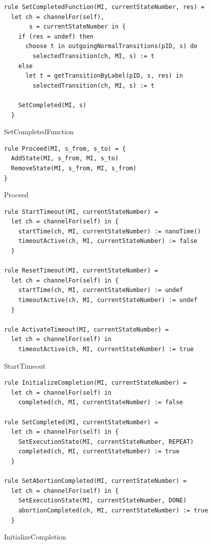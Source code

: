 \begin{listing}[H]
\begin{verbatim}
rule SetCompletedFunction(MI, currentStateNumber, res) =
  let ch = channelFor(self),
       s = currentStateNumber in {
    if (res = undef) then
      choose t in outgoingNormalTransitions(pID, s) do
        selectedTransition(ch, MI, s) := t
    else
      let t = getTransitionByLabel(pID, s, res) in
        selectedTransition(ch, MI, s) := t

    SetCompleted(MI, s)
  }
\end{verbatim}
\caption{SetCompletedFunction}
\label{lst:asm:SetCompletedFunction}
\end{listing}



\begin{listing}[H]
\begin{verbatim}
rule Proceed(MI, s_from, s_to) = {
  AddState(MI, s_from, MI, s_to)
  RemoveState(MI, s_from, MI, s_from)
}
\end{verbatim}
\caption{Proceed}
\label{lst:asm:Proceed}
\end{listing}




\begin{listing}[H]
\begin{verbatim}
rule StartTimeout(MI, currentStateNumber) =
  let ch = channelFor(self) in {
    startTime(ch, MI, currentStateNumber) := nanoTime()
    timeoutActive(ch, MI, currentStateNumber) := false
  }

rule ResetTimeout(MI, currentStateNumber) =
  let ch = channelFor(self) in {
    startTime(ch, MI, currentStateNumber) := undef
    timeoutActive(ch, MI, currentStateNumber) := undef
  }

rule ActivateTimeout(MI, currentStateNumber) =
  let ch = channelFor(self) in
    timeoutActive(ch, MI, currentStateNumber) := true
\end{verbatim}
\caption{StartTimeout}
\label{lst:asm:StartTimeout}
\end{listing}


\begin{listing}[H]
\begin{verbatim}
rule InitializeCompletion(MI, currentStateNumber) =
  let ch = channelFor(self) in
    completed(ch, MI, currentStateNumber) := false

rule SetCompleted(MI, currentStateNumber) =
  let ch = channelFor(self) in {
    SetExecutionState(MI, currentStateNumber, REPEAT)
    completed(ch, MI, currentStateNumber) := true
  }

rule SetAbortionCompleted(MI, currentStateNumber) =
  let ch = channelFor(self) in {
    SetExecutionState(MI, currentStateNumber, DONE)
    abortionCompleted(ch, MI, currentStateNumber) := true
  }
\end{verbatim}
\caption{InitializeCompletion}
\label{lst:asm:InitializeCompletion}
\end{listing}


